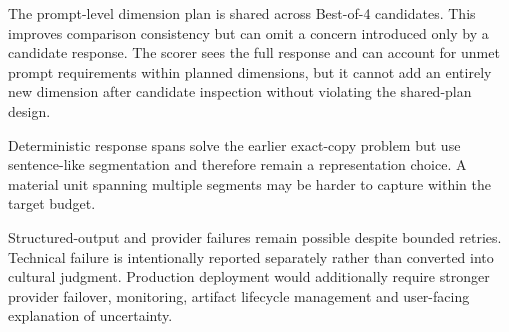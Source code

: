 The prompt-level dimension plan is shared across Best-of-4 candidates. This improves comparison consistency but can omit a concern introduced only by a candidate response. The scorer sees the full response and can account for unmet prompt requirements within planned dimensions, but it cannot add an entirely new dimension after candidate inspection without violating the shared-plan design.

Deterministic response spans solve the earlier exact-copy problem but use sentence-like segmentation and therefore remain a representation choice. A material unit spanning multiple segments may be harder to capture within the target budget.

Structured-output and provider failures remain possible despite bounded retries. Technical failure is intentionally reported separately rather than converted into cultural judgment. Production deployment would additionally require stronger provider failover, monitoring, artifact lifecycle management and user-facing explanation of uncertainty.
